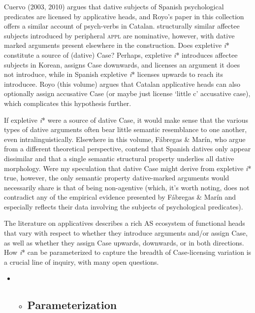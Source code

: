 \documentclass[output=paper,modfonts,nonflat]{langsci/langscibook}
\begin{document}
\begin{styleDefault}
Cuervo (2003, 2010) argues that dative subjects of Spanish psychological predicates are licensed by applicative heads, and Royo’s paper in this collection offers a similar account of psych-verbs in Catalan.  structurally similar affectee subjects introduced by peripheral \textsc{appl} are nominative, however, with dative marked arguments present elsewhere in the construction. Does expletive \textit{i}* constitute a source of (dative) Case? Perhaps, expletive \textit{i}* introduces affectee subjects in Korean, assigns Case downwards, and licenses an argument it does not introduce, while in Spanish expletive \textit{i}* licenses upwards to reach its introducee. Royo (this volume) argues that Catalan applicative heads can also optionally assign accusative Case (or maybe just license ‘little c’ accusative case), which complicates this hypothesis further. 
\end{styleDefault}

\begin{styleDefault}
If expletive \textit{i}* were a source of dative Case, it would make sense that the various types of dative arguments often bear little semantic resemblance to one another, even intralinguistically. Elsewhere in this volume, Fábregas \& Marín, who argue from a different theoretical perspective, contend that Spanish datives only appear dissimilar and that a single semantic structural property underlies all dative morphology. Were my speculation that dative Case might derive from expletive \textit{i}* true, however, the only semantic property dative-marked arguments would necessarily share is that of being non-agentive (which, it’s worth noting, does not contradict any of the empirical evidence presented by Fábregas \& Marín and especially reflects their data involving the subjects of psychological predicates). 
\end{styleDefault}

\begin{styleDefault}
The literature on applicatives describes a rich AS ecosystem of functional heads that vary with respect to whether they introduce arguments and/or assign Case, as well as whether they assign Case upwards, downwards, or in both directions. How \textit{i}* can be parameterized to capture the breadth of Case-licensing variation is a crucial line of inquiry, with many open questions.
\end{styleDefault}

\begin{itemize}
\item \begin{itemize}
\item \subsection{Parameterization} 
\end{itemize}
\end{itemize}
\end{document}
